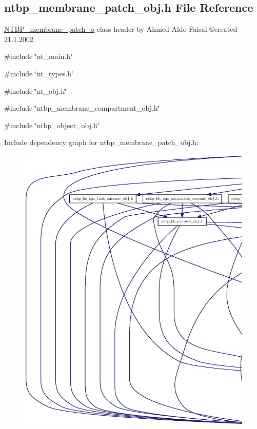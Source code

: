 \subsection{ntbp\_\-membrane\_\-patch\_\-obj.h File Reference}
\label{ntbp__membrane__patch__obj_8h}



\begin{DoxyItemize}
\item \hyperlink{class_n_t_b_p__membrane__patch__o}{NTBP\_\-membrane\_\-patch\_\-o} class header by Ahmed Aldo Faisal \copyright created 21.1.2002 
\end{DoxyItemize} 


{\ttfamily \#include \char`\"{}nt\_\-main.h\char`\"{}}\par
{\ttfamily \#include \char`\"{}nt\_\-types.h\char`\"{}}\par
{\ttfamily \#include \char`\"{}nt\_\-obj.h\char`\"{}}\par
{\ttfamily \#include \char`\"{}ntbp\_\-membrane\_\-compartment\_\-obj.h\char`\"{}}\par
{\ttfamily \#include \char`\"{}ntbp\_\-object\_\-obj.h\char`\"{}}\par
Include dependency graph for ntbp\_\-membrane\_\-patch\_\-obj.h:
\nopagebreak
\begin{figure}[H]
\begin{center}
\leavevmode
\includegraphics[width=400pt]{ntbp__membrane__patch__obj_8h__incl}
\end{center}
\end{figure}

